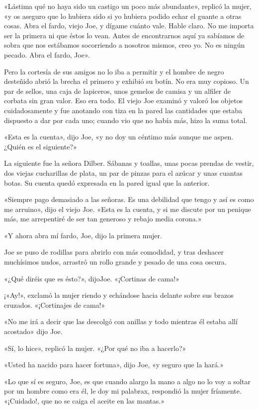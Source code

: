\documentclass{novela}
\begin{document}
 «Lástima qué no haya sido un castigo un poco más abundante», replicó la mujer, «y os aseguro que lo hubiera sido si yo hubiera podido echar el guante a otras cosas. Abra el fardo, viejo Joe, y dígame cuánto vale. Hable claro. No me importa ser la primera ni que éstos lo vean. Antes de encontrarnos aquí ya sabíamos de sobra que nos estábamos socorriendo a nosotros mismos, creo yo. No es ningún pecado. Abra el fardo, Joe».

 Pero la cortesía de sus amigos no lo iba a permitir y el hombre de negro desteñido abrió la brecha el primero y exhibió su botín. No era muy copioso. Un par de sellos, una caja de lapiceros, unos gemelos de camisa y un alfiler de corbata sin gran valor. Eso era todo. El viejo Joe examinó y valoró los objetos cuidadosamente y fue anotando con tiza en la pared las cantidades que estaba dispuesto a dar por cada uno; cuando vio que no había más, hizo la suma total.

 «Esta es la cuenta», dijo Joe, «y no doy un céntimo más aunque me aspen. ¿Quién es el siguiente?»

 La siguiente fue la señora Dilber. Sábanas y toallas, unas pocas prendas de vestir, dos viejas cucharillas de plata, un par de pinzas para el azúcar y unas cuantas botas. Su cuenta quedó expresada en la pared igual que la anterior.

 «Siempre pago demasiado a las señoras. Es una debilidad que tengo y así es como me arruino», dijo el viejo Joe. «Esta es la cuenta, y si me discute por un penique más, me arrepentiré de ser tan generoso y rebajo media corona.»

 «Y ahora abra mí fardo, Joe, dijo la primera mujer.

 Joe se puso de rodillas para abrirlo con más comodidad, y tras deshacer muchísimos nudos, arrastró un rollo grande y pesado de una cosa oscura.

 «¿Qué diréis que es ésto?», dijoJoe. «¡Cortinas de cama!»

 ¡«Ay!», exclamó la mujer riendo y echándose hacia delante sobre sus brazos cruzados. «¡Cortinajes de cama!»

 «No me irá a decir que las descolgó con anillas y todo mientras él estaba allí acostado» dijo Joe.

 «Sí, lo hice», replicó la mujer. «¿Por qué no iba a hacerlo?»

 «Usted ha nacido para hacer fortuna», dijo Joe, «y seguro que la hará.»

 «Lo que sí es seguro, Joe, es que cuando alargo la mano a algo no lo voy a soltar por un hombre como era él, le doy mi palabrax, respondió la mujer fríamente. «¡Cuidado!, que no se caiga el aceite en las mantas.»
\end{document}

